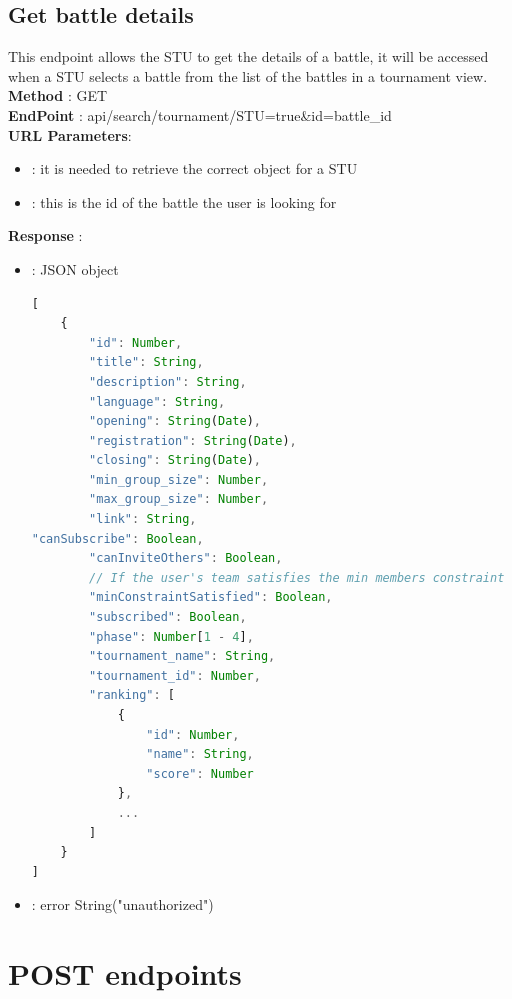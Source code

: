 \subsection*{Get battle details}
This endpoint allows the STU to get the details of a battle, it will be accessed when a STU selects a battle from the list of the battles in a tournament view.\\
\textbf{Method} : GET \\
\textbf{EndPoint} : api/search/tournament/STU=true\&id=battle\_id\\
\textbf{URL Parameters}:
\begin{itemize}
    \item {} : it is needed to retrieve the correct object for a STU
    \item {} : this is the id of the battle the user is looking for
\end{itemize}
\textbf{Response} : 
    \begin{itemize}
        \item {} : JSON object
        \begin{lstlisting}[language=JavaScript, label={lst:jscode}, basicstyle=\ttfamily]
[
    {
        "id": Number,
        "title": String,
        "description": String,
        "language": String,
        "opening": String(Date),
        "registration": String(Date),
        "closing": String(Date),
        "min_group_size": Number,
        "max_group_size": Number,
        "link": String,
"canSubscribe": Boolean,
        "canInviteOthers": Boolean,
        // If the user's team satisfies the min members constraint
        "minConstraintSatisfied": Boolean,
        "subscribed": Boolean,
        "phase": Number[1 - 4],
        "tournament_name": String,
        "tournament_id": Number,
        "ranking": [
            {
                "id": Number,
                "name": String,
                "score": Number
            },
            ...
        ]
    }
]
        \end{lstlisting} 
        \item {} : error String("unauthorized")
    \end{itemize}

\section*{POST endpoints}

